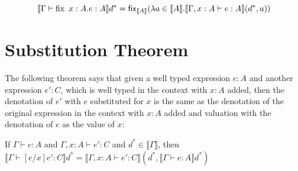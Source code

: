 \[\llbracket \Gamma \vdash \operatorname{fix} \ x : A. e : A \rrbracket d^* = \operatorname{\mathsf{fix}}_{\llbracket A \rrbracket} (\lambda a \in \llbracket A \rrbracket . \llbracket \Gamma, x : A \vdash e : A \rrbracket(d^*, a)) \] 

\section{Substitution Theorem}
The following theorem says that given a well typed expression $e : A$ and another expression $e' : C$, which is well typed in the context with $x:A$ added, then the denotation of $e'$ with $e$ substituted for $x$ is the same as the denotation of the original expression in the context with $x:A$ added and valuation with the denotation of $e$ as the value of $x$:

\vspace{0.5cm}

\begin{thm}\label{subst}
If $\Gamma \vdash e : A$ and $\Gamma, x:A \vdash e' : C$ and $d^* \in \llbracket \Gamma \rrbracket$, then $\llbracket \Gamma \vdash [e/x]e' : C \rrbracket d^* =\llbracket \Gamma, x : A \vdash e': C \rrbracket (d^*, \llbracket \Gamma \vdash e : A \rrbracket d^*)$
\end{thm}

